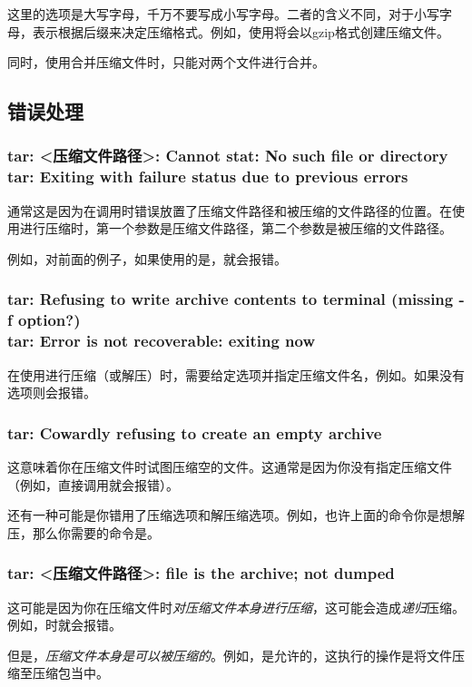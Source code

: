 \begin{attention}
    这里的选项是大写字母，千万不要写成小写字母。二者的含义不同，对于小写字母，表示根据后缀来决定压缩格式。例如，使用将会以gzip格式创建压缩文件。

    同时，使用合并压缩文件时，只能对两个文件进行合并。
\end{attention}


\subsection{错误处理}\label{subsec:压缩与解压缩-错误处理}

\subsubsection{tar: <压缩文件路径>: Cannot stat: No such file or directory \\tar: Exiting with failure status due to previous errors}

通常这是因为在调用时错误放置了压缩文件路径和被压缩的文件路径的位置。在使用进行压缩时，第一个参数是压缩文件路径，第二个参数是被压缩的文件路径。

例如，对前面的例子，如果使用的是，就会报错。

\subsubsection{tar: Refusing to write archive contents to terminal (missing -f option?) \\tar: Error is not recoverable: exiting now}

在使用进行压缩（或解压）时，需要给定选项并指定压缩文件名，例如。如果没有选项则会报错。

\subsubsection{tar: Cowardly refusing to create an empty archive}

这意味着你在压缩文件时试图压缩空的文件。这通常是因为你没有指定压缩文件（例如，直接调用就会报错）。

还有一种可能是你错用了压缩选项和解压缩选项。例如，也许上面的命令你是想解压，那么你需要的命令是。

\subsubsection{tar: <压缩文件路径>: file is the archive; not dumped}

这可能是因为你在压缩文件时\emph{对压缩文件本身进行压缩}，这可能会造成\emph{递归}压缩。例如，时就会报错。

但是，\emph{压缩文件本身是可以被压缩的}。例如，是允许的，这执行的操作是将文件压缩至压缩包当中。